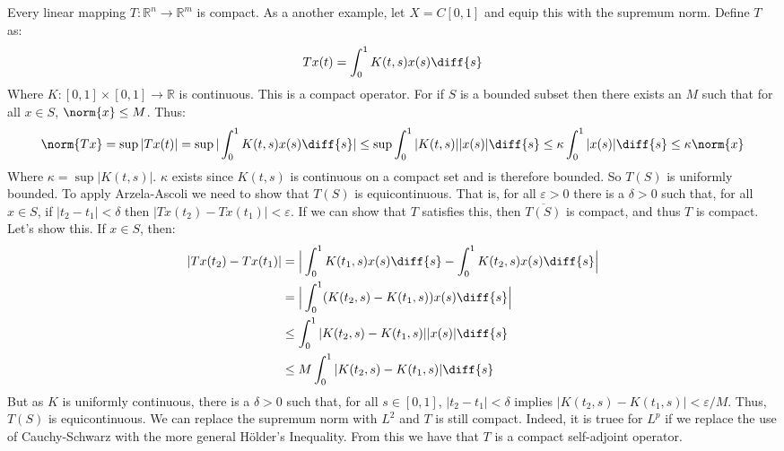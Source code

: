 \documentclass[crop=false,class=book,oneside]{standalone}
\begin{document}
            \begin{example}
                Every linear mapping
                $T:\mathbb{R}^{n}\rightarrow\mathbb{R}^{m}$ is compact.
                As a another example, let
                $X=C[0,1]$ and equip this with the supremum norm.
                Define $T$ as:
                \begin{equation*}
                    Tx(t)=\int_{0}^{1}K(t,s)x(s)\diff{s}
                \end{equation*}
                Where $K:[0,1]\times[0,1]\rightarrow\mathbb{R}$
                is continuous. This is a compact operator. For if
                $S$ is a bounded subset then there exists an $M$ such
                that for all $x\in{S}$, $\norm{x}\leq{M}$. Thus:
                \begin{equation*}
                    \norm{Tx}=\sup|Tx(t)|
                    =\sup|\int_{0}^{1}K(t,s)x(s)\diff{s}|
                    \leq\sup\int_{0}^{1}|K(t,s)||x(s)|\diff{s}
                    \leq\kappa\int_{0}^{1}|x(s)|\diff{s}
                    \leq\kappa\norm{x}
                \end{equation*}
                Where $\kappa=\sup|K(t,s)|$. $\kappa$ exists since
                $K(t,s)$ is continuous on a compact set and is therefore
                bounded. So $T(S)$ is uniformly bounded. To apply
                Arzela-Ascoli we need to show that
                $T(S)$ is equicontinuous. That is, for all
                $\varepsilon>0$ there is a $\delta>0$ such that,
                for all $x\in{S}$, if $|t_{2}-t_{1}|<\delta$
                then $|Tx(t_{2})-Tx(t_{1})|<\varepsilon$. If we
                can show that $T$ satisfies this, then
                $\overline{T(S)}$ is compact, and thus $T$ is compact.
                Let's show this. If $x\in{S}$, then:
                \begin{align*}
                    |Tx(t_{2})-Tx(t_{1})|
                    &=\Big|\int_{0}^{1}K(t_{1},s)x(s)\diff{s}
                    -\int_{0}^{1}K(t_{2},s)x(s)\diff{s}\Big|\\
                    &=\Big|\int_{0}^{1}(K(t_{2},s)-
                    K(t_{1},s))x(s)\diff{s}\Big|\\
                    &\leq
                    \int_{0}^{1}|K(t_{2},s)-K(t_{1},s)||x(s)|\diff{s}\\
                    &\leq{M}\int_{0}^{1}|K(t_{2},s)-K(t_{1},s)|\diff{s}
                \end{align*}
                But as $K$ is uniformly continuous, there is a $\delta>0$
                such that, for all $s\in[0,1]$,
                $|t_{2}-t_{1}|<\delta$ implies
                $|K(t_{2},s)-K(t_{1},s)|<\varepsilon/M$.
                Thus, $T(S)$ is equicontinuous. We can replace the
                supremum norm with $L^{2}$ and $T$ is still compact.
                Indeed, it is truee for $L^{p}$ if we replace the
                use of Cauchy-Schwarz with the more general
                H\"{o}lder's Inequality. From this we have that
                $T$ is a compact self-adjoint operator.
            \end{example}
\end{document}
